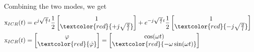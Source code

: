 \begin{examplesection}
    Combining the two modes, we get
    \begin{align*}
        \mathrm{x}_{ICR}(t) & = e^{j\sqrt{\frac{g}{l}}t}\frac{1}{2}
        \begin{bmatrix}
            1 \\
            \textcolor{red}{+j \sqrt{\frac{g}{l}}}
        \end{bmatrix} + e^{-j\sqrt{\frac{g}{l}}t}\frac{1}{2}
        \begin{bmatrix}
            1 \\
            \textcolor{red}{-j \sqrt{\frac{g}{l}}}
        \end{bmatrix}                      \\
        \mathrm{x}_{ICR}(t) & = \begin{bmatrix}
                                    \varphi \\
                                    \textcolor{red}{\dot{\varphi}}
                                \end{bmatrix}
        = \begin{bmatrix}
              \cos(\omega t) \\
              \textcolor{red}{-\omega\sin(\omega t)}
          \end{bmatrix}
    \end{align*}
\end{examplesection}
